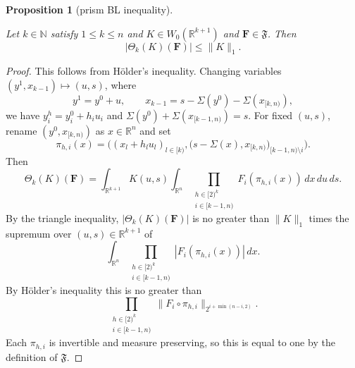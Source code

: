 \documentclass[12pt,reqno]{amsart}
\theoremstyle{plain}
\newtheorem{proposition}[theorem]{Proposition}
\numberwithin{equation}{section}
\theoremstyle{remark}
\newcommand{\uses}[1]{}
\newcommand{\usesdefs}[1]{}
\newcommand{\R}{{\mathbb R}}
\newcommand{\N}{{\mathbb N}}
\newcommand{\F}{\mathbf{F}}
\begin{document}
\begin{proposition}[prism BL inequality]\label{prism BL inequality}\uses{}\usesdefs{auto:Wiener-space-definition,normalized function tuples,prism Brascamp--Lieb}

Let $k\in\N$ satisfy $1\le k\le n$ and $K\in W_0(\R^{k+1})$ and $\F\in \mathfrak{F}$. Then
\begin{equation}\label{prism-k-bound}
   |\Theta_k(K)(\F)| \le \|K\|_1.
\end{equation}
\end{proposition}

\begin{proof}
This follows from H\"older's inequality.
Changing variables $(y^1,x_{k-1})\mapsto (u,s)$, where
\[
y^1=y^0+u,\qquad x_{k-1}=s-\Sigma(y^0)-\Sigma(x_{[k,n)}),
\]
we have $y_i^h=y_i^0+h_iu_i$ and
$\Sigma(y^0)+\Sigma(x_{[k-1,n)})=s$. For fixed $(u,s)$, rename
$(y^0,x_{[k,n)})$ as $x\in\R^n$ and set
\[
\pi_{h,i}(x)
=
\Big((x_l+h_lu_l)_{l\in [k)},
\big(s-\Sigma(x),x_{[k,n)}\big)_{[k-1,n)\setminus i}\Big).
\]
Then
\[
\Theta_k(K)(\F)
=
\int_{\R^{k+1}} K(u,s)
\int_{\R^n}
\prod_{\substack{h\in [2)^k\\ i\in [k-1,n)}}
F_i(\pi_{h,i}(x))
\,dx\,du\,ds.
\]
By the triangle inequality, $|\Theta_k(K)(\F)|$ is no greater than $\|K\|_1$ times the supremum over $(u,s)\in\R^{k+1}$ of
\[
\int_{\R^n}
\prod_{\substack{h\in [2)^k\\ i\in [k-1,n)}}
|F_i(\pi_{h,i}(x))|
\,dx.
\]
By H\"older's inequality this is no greater than
\[
\prod_{\substack{h\in [2)^k\\ i\in [k-1,n)}}
\|F_i\circ\pi_{h,i}\|_{2^{i+\min(n-i,2)}}.
\]
Each $\pi_{h,i}$ is invertible and measure preserving, so this is equal to one by the definition of $\mathfrak{F}$.
\end{proof}
\end{document}

